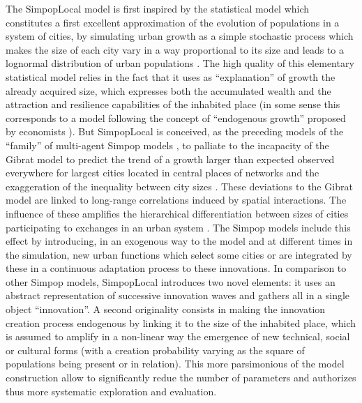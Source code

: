 \documentclass[10pt]{article}
\begin{document}
The SimpopLocal model is first inspired by the statistical model which constitutes a first excellent approximation of the evolution of populations in a system of cities, by simulating urban growth as a simple stochastic process which makes the size of each city vary in a way proportional to its size and leads to a lognormal distribution of urban populations \citep{gibrat1931inegalites}. The high quality of this elementary statistical model relies in the fact that it uses as ``explanation'' of growth the already acquired size, which expresses both the accumulated wealth and the attraction and resilience capabilities of the inhabited place (in some sense this corresponds to a model following the concept of ``endogenous growth'' proposed by economists \citep{aghion1998endogenous}). But SimpopLocal is conceived, as the preceding models of the ``family'' of multi-agent Simpop models \citep{bura1996multiagent,sanders2007artificial}, to palliate to the incapacity of the Gibrat model to predict the trend of a growth larger than expected observed everywhere for largest cities located in central places of networks \citep{moriconi1993urbanisation} and the exaggeration of the inequality between city sizes \citep{pumain1997pour,bretagnolle2010simulating}. These deviations to the Gibrat model are linked to long-range correlations \citep{rozenfeld2008laws} induced by spatial interactions. The influence of these amplifies the hierarchical differentiation between sizes of cities participating to exchanges in an urban system \citep{favaro2011gibrat}. The Simpop models include this effect by introducing, in an exogenous way to the model and at different times in the simulation, new urban functions which select some cities or are integrated by these in a continuous adaptation process to these innovations. In comparison to other Simpop models, SimpopLocal introduces two novel elements: it uses an abstract representation of successive innovation waves and gathers all in a single object ``innovation''. A second originality consists in making the innovation creation process endogenous by linking it to the size of the inhabited place, which is assumed to amplify in a non-linear way the emergence of new technical, social or cultural forms (with a creation probability varying as the square of populations being present or in relation). This more parsimonious of the model construction allow to significantly redue the number of parameters and authorizes thus more systematic exploration and evaluation.
\end{document}
